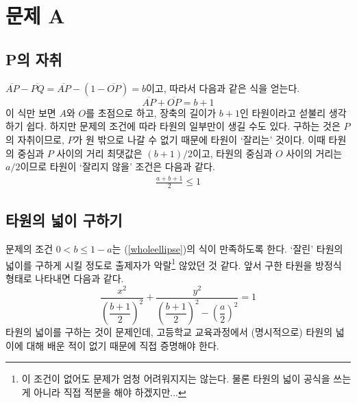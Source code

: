 \documentclass{scrartcl}
\title{\doctitle}
\author{Project Eclipse (손량)}
\date{Last compiled on: \today, \currenttime}
\newcommand{\Seg}[1]{\overline{#1}}
\begin{document}
\maketitle

\section{문제 A}
\subsection{P의 자취}
\(\Seg{AP}-\Seg{PQ}=\Seg{AP}-\left(1-\Seg{OP}\right)=b\)이고, 따라서 다음과 같은 식을 얻는다.
\[
\Seg{AP}+\Seg{OP}=b+1
\]
이 식만 보면 \(A\)와 \(O\)를 초점으로 하고, 장축의 길이가 \(b+1\)인 타원이라고 섣불리 생각하기 쉽다. 하지만 문제의 조건에 따라 타원의 일부만이 생길 수도 있다. 구하는 것은 \(P\)의 자취이므로, \(P\)가 원 밖으로 나갈 수 없기 때문에 타원이 `잘리는' 것이다. 이때 타원의 중심과 \(P\) 사이의 거리 최댓값은 \((b+1)/2\)이고, 타원의 중심과 \(O\) 사이의 거리는 \(a/2\)이므로 타원이 `잘리지 않을' 조건은 다음과 같다.
\begin{align}\label{wholeellipse}\frac{a+b+1}{2}\leq 1\end{align}

\subsection{타원의 넓이 구하기}
문제의 조건 \(0<b\leq 1-a\)는 (\ref{wholeellipse})의 식이 만족하도록 한다. `잘린' 타원의 넓이를 구하게 시킬 정도로 출제자가 악랄\footnote{이 조건이 없어도 문제가 엄청 어려워지지는 않는다. 물론 타원의 넓이 공식을 쓰는게 아니라 직접 적분을 해야 하겠지만...} 않았던 것 같다. 앞서 구한 타원을 방정식 형태로 나타내면 다음과 같다.
\[
\frac{x^2}{\left( \dfrac{b+1}{2} \right)^2}+\frac{y^2}{\left( \dfrac{b+1}{2} \right)^2-\left( \dfrac{a}{2} \right)^2}=1
\]
타원의 넓이를 구하는 것이 문제인데, 고등학교 교육과정에서 (명시적으로) 타원의 넓이에 대해 배운 적이 없기 때문에 직접 증명해야 한다.
\end{document}
